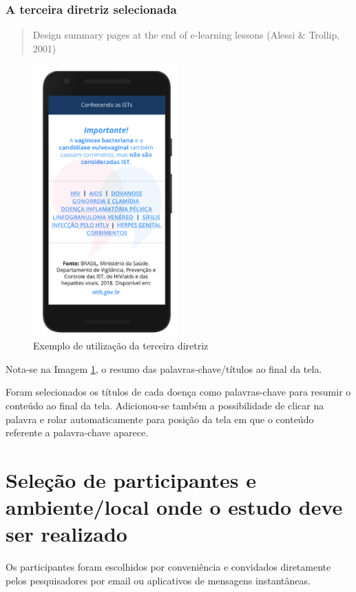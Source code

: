 \documentclass[12pt]{article}
\begin{document}
\subsubsection{A terceira diretriz selecionada}

\begin{quote}
	Design summary pages at the end of e-learning lessons (Alessi \& Trollip, 2001)
\end{quote}

\begin{figure}[H]
  \centering
  \includegraphics[width=15em]{images/image_3.png}
  \caption{Exemplo de utilização da terceira diretriz}
  \label{fig:img3}
\end{figure}

Nota-se na Imagem \ref{fig:img3}, o resumo das palavras-chave/títulos ao final da tela.

Foram selecionados os títulos de cada doença como palavras-chave para resumir o conteúdo ao final da tela. Adicionou-se também a possibilidade de clicar na palavra e rolar automaticamente para posição da tela em que o conteúdo referente a palavra-chave aparece.

\section{Seleção de participantes e ambiente/local onde o estudo deve ser realizado}

Os participantes foram escolhidos por conveniência e convidados diretamente pelos pesquisadores por email ou aplicativos de mensagens instantâneas. 
\end{document}
